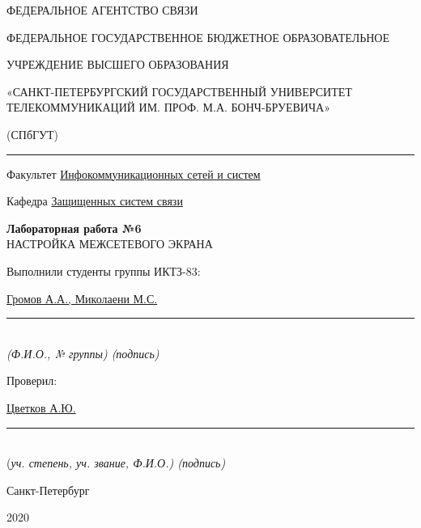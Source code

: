 \documentclass[a4paper,14pt]{extarticle}
\begin{document}
    \begin{center}
        \thispagestyle{empty}
        \begin{singlespace}
        ФЕДЕРАЛЬНОЕ АГЕНТСТВО СВЯЗИ

        ФЕДЕРАЛЬНОЕ ГОСУДАРСТВЕННОЕ БЮДЖЕТНОЕ ОБРАЗОВАТЕЛЬНОЕ

        УЧРЕЖДЕНИЕ ВЫСШЕГО ОБРАЗОВАНИЯ

        «САНКТ-ПЕТЕРБУРГСКИЙ ГОСУДАРСТВЕННЫЙ УНИВЕРСИТЕТ ТЕЛЕКОММУНИКАЦИЙ ИМ. ПРОФ. М.А. БОНЧ-БРУЕВИЧА»

        (СПбГУТ)
        \end{singlespace}
        \vspace{-1ex}
        \rule{\textwidth}{0.4pt}
        \vspace{-5ex}

        Факультет \underline{Инфокоммуникационных сетей и систем}

        Кафедра \underline{Защищенных систем связи}
        \vspace{10ex}

        \textbf{Лабораторная работа №6}\\
        НАСТРОЙКА МЕЖСЕТЕВОГО ЭКРАНА


    \end{center}
    \vspace{4ex}
    \begin{flushright}
    \parbox{10 cm}{
    \begin{flushleft}
        Выполнили студенты группы ИКТЗ-83:

        \underline{Громов А.А., Миколаени М.С.} \hfill \rule[-0.85ex]{0.1\textwidth}{0.6pt}\\
        \vspace{-1ex}
        \footnotesize \textit{ (Ф.И.О., № группы) \hfill (подпись)} \normalsize

        Проверил:

        \underline{Цветков А.Ю.} \hfill \rule[-0.85ex]{0.1\textwidth}{0.6pt}\\
        \vspace{-1ex}
        (\footnotesize \textit{уч. степень, уч. звание, Ф.И.О.) \hfill (подпись)} \normalsize

    \end{flushleft}
    }
    \end{flushright}
    \begin{center}
        \vfill
        Санкт-Петербург

        2020

    \end{center}
    \newpage
\end{document}
